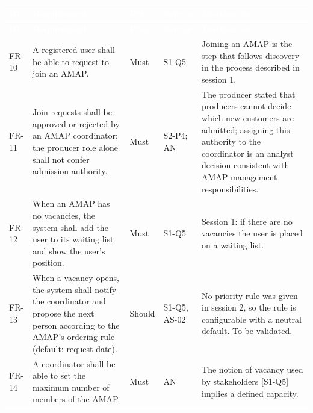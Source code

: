 \documentclass[11pt,a4paper]{article}
\begin{document}
{\footnotesize
\begin{longtable}{>{\raggedright\arraybackslash\hspace{0pt}}p{}>{\raggedright\arraybackslash\hspace{0pt}}p{}>{\raggedright\arraybackslash\hspace{0pt}}p{}>{\raggedright\arraybackslash\hspace{0pt}}p{}>{\raggedright\arraybackslash\hspace{0pt}}p{}}
\rowcolor{hdr}\textcolor{white}{\textbf{ID}} & \textcolor{white}{\textbf{Requirement}} & \textcolor{white}{\textbf{Prio.}} & \textcolor{white}{\textbf{Source}} & \textcolor{white}{\textbf{Justification}} \\ \endfirsthead
\rowcolor{hdr}\textcolor{white}{\textbf{ID}} & \textcolor{white}{\textbf{Requirement}} & \textcolor{white}{\textbf{Prio.}} & \textcolor{white}{\textbf{Source}} & \textcolor{white}{\textbf{Justification}} \\ \endhead
FR-10 & A registered user shall be able to request to join an AMAP. & Must & S1-Q5 & Joining an AMAP is the step that follows discovery in the process described in session 1. \\ \hline
FR-11 & Join requests shall be approved or rejected by an AMAP coordinator; the producer role alone shall not confer admission authority. & Must & S2-P4; AN & The producer stated that producers cannot decide which new customers are admitted; assigning this authority to the coordinator is an analyst decision consistent with AMAP management responsibilities. \\ \hline
FR-12 & When an AMAP has no vacancies, the system shall add the user to its waiting list and show the user's position. & Must & S1-Q5 & Session 1: if there are no vacancies the user is placed on a waiting list. \\ \hline
FR-13 & When a vacancy opens, the system shall notify the coordinator and propose the next person according to the AMAP's ordering rule (default: request date). & Should & S1-Q5, AS-02 & No priority rule was given in session 2, so the rule is configurable with a neutral default. To be validated. \\ \hline
FR-14 & A coordinator shall be able to set the maximum number of members of the AMAP. & Must & AN & The notion of vacancy used by stakeholders [S1-Q5] implies a defined capacity. \\ \hline
\end{longtable}}
\addtocounter{table}{-1}
\end{document}
